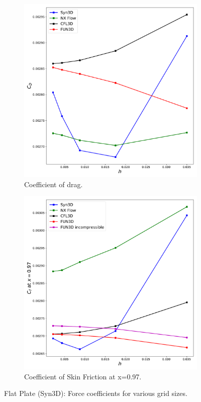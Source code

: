 \begin{figure}[ht!]
\centering
\begin{subfigure}{.45\textwidth}
  \centering
  \includegraphics[width=1.0\textwidth]{figs/flat/cd_grid.pdf}
  \caption{Coefficient of drag.}
\end{subfigure}%
\begin{subfigure}{.45\textwidth}
  \centering
  \includegraphics[width=1.0\textwidth]{figs/flat/cf_grid.pdf}
  \caption{Coefficient of Skin Friction at x=0.97.}
\end{subfigure}
\caption{Flat Plate (Syn3D): Force coefficients for various grid sizes.}
\label{fig:synflatforcestudy}
\end{figure}

